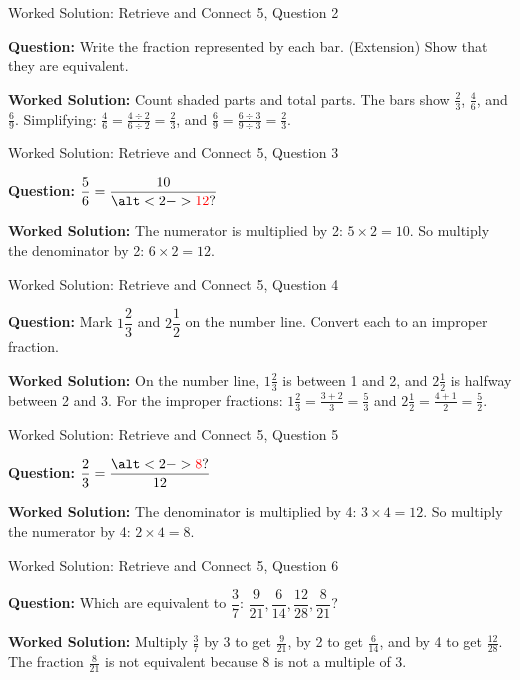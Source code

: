 \documentclass{beamer}
\newcommand{\ashow}[1]{\uncover<2->{\textcolor{red}{\small #1}}}
\newcommand{\ashowq}[1]{\alt<2->{\textcolor{red}{\small #1}}{?}}
\begin{document}
\begin{frame}{Worked Solution: Retrieve and Connect 5, Question 2}

\textbf{Question:} Write the fraction represented by each bar. (Extension) Show that they are equivalent.

\textbf{Worked Solution:} Count shaded parts and total parts. The bars show $\frac23$, $\frac46$, and $\frac69$. Simplifying: $\frac46 = \frac{4 \div 2}{6 \div 2} = \frac23$, and $\frac69 = \frac{6 \div 3}{9 \div 3} = \frac23$. \ashow{$\frac23=\frac46=\frac69$.}
\end{frame}

\begin{frame}{Worked Solution: Retrieve and Connect 5, Question 3}

\textbf{Question:} $\dfrac{5}{6}=\dfrac{10}{\ashowq{12}}$

\textbf{Worked Solution:} The numerator is multiplied by 2: $5 \times 2 = 10$. So multiply the denominator by 2: $6 \times 2 = 12$. \ashow{The missing denominator is 12.}
\end{frame}

\begin{frame}{Worked Solution: Retrieve and Connect 5, Question 4}

\textbf{Question:} Mark $1\dfrac{2}{3}$ and $2\dfrac{1}{2}$ on the number line. Convert each to an improper fraction.

\textbf{Worked Solution:} On the number line, $1\frac23$ is between 1 and 2, and $2\frac12$ is halfway between 2 and 3. For the improper fractions: $1\frac23 = \frac{3+2}{3} = \frac53$ and $2\frac12 = \frac{4+1}{2} = \frac52$. \ashow{$1\frac23=\frac53$, and $2\frac12=\frac52$.}
\end{frame}

\begin{frame}{Worked Solution: Retrieve and Connect 5, Question 5}

\textbf{Question:} $\dfrac{2}{3}=\dfrac{\ashowq{8}}{12}$

\textbf{Worked Solution:} The denominator is multiplied by 4: $3 \times 4 = 12$. So multiply the numerator by 4: $2 \times 4 = 8$. \ashow{The missing numerator is 8.}
\end{frame}

\begin{frame}{Worked Solution: Retrieve and Connect 5, Question 6}

\textbf{Question:} Which are equivalent to $\dfrac{3}{7}$: $\dfrac{9}{21}, \dfrac{6}{14}, \dfrac{12}{28}, \dfrac{8}{21}$?

\textbf{Worked Solution:} Multiply $\frac37$ by 3 to get $\frac{9}{21}$, by 2 to get $\frac{6}{14}$, and by 4 to get $\frac{12}{28}$. The fraction $\frac{8}{21}$ is not equivalent because $8$ is not a multiple of $3$. \ashow{$\frac{9}{21},\ \frac{6}{14},\ \frac{12}{28}$.}
\end{frame}
\end{document}
